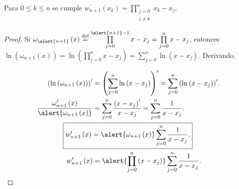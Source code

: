\begin{frame}
	\begin{theorem}
		Para $0\leq k\leq n$ se cumple
		\begin{math}
			w^{\prime}_{n+1}
			\left(x_{k}\right)=
			\prod\limits_{\substack{j=0\\j\neq k}}^{n}
			x_{k}-x_{j}.
		\end{math}
	\end{theorem}

	\begin{proof}
		Si
		\begin{math}
			\omega_{\alert{n+1}}
			\left(x\right)
			\overset{\text{def}}{=}
			\prod\limits_{j=0}^{\alert{n+1}-1}
			x-x_{j}=
			\prod\limits_{j=0}^{n}
			x-x_{j}
		\end{math}, entonces
		\begin{math}
			\ln
			\left(
			\omega_{n+1}
			\left(x\right)
			\right)=
			\ln
			\left(
			\prod\limits_{j=0}^{n}
			x-x_{j}
			\right)=
			\sum\limits_{j=0}^{n}
			\ln
			\left(
			x-x_{j}
			\right)
		\end{math}.
		Derivando,

		\begin{align*}
			{\left(
				\ln
				\left(
					\omega_{n+1}
					\left(x\right)
					\right)
			\right)}^{\prime} & =
			{\left(
			\sum\limits_{j=0}^{n}
			\ln
			\left(
				x-x_{j}
				\right)
			\right)}^{\prime}=
			\sum\limits_{j=0}^{n}
			{\left(
			\ln
			\left(
				x-x_{j}
				\right)
			\right)}^{\prime}.
			\\
			\dfrac{
				\omega^{\prime}_{n+1}\left(x\right)
			}{
				\alert{
					\omega_{n+1}\left(x\right)
				}
			}                 & =
			\sum\limits_{j=0}^{n}
			\dfrac{{\left(x-x_{j}\right)}^{\prime}}{x-x_{j}}=
			\sum\limits_{j=0}^{n}
			\dfrac{1}{x-x_{j}}.
			\\
			\Aboxed{
			w^{\prime}_{n+1}
			\left(x\right)    & =
			\alert{
				\omega_{n+1}
				\left(x\right)
			}
			\sum\limits_{j=0}^{n}
			\dfrac{1}{x-x_{j}}.
			}
			\\
			w^{\prime}_{n+1}
			\left(x\right)
			                  & =
			\alert{
				\prod\limits_{j=0}^{n}
				\left(
				x-x_{j}
				\right)
			}
			\sum\limits_{j=0}^{n}
			\dfrac{1}{x-x_{j}}.
		\end{align*}
	\end{proof}
\end{frame}

